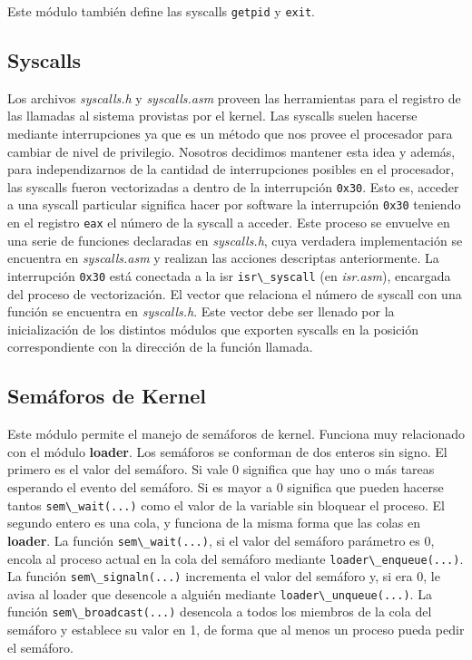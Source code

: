 \documentclass[a4paper]{article}
\newcommand{\file}[1]{\textit{#1}}
\newcommand{\func}[1]{\lstinline{#1}}
\begin{document}
Este módulo también define las syscalls \func{getpid} y \func{exit}.


\subsection{Syscalls}

Los archivos \file{syscalls.h} y \file{syscalls.asm} proveen las herramientas para el registro de las llamadas al sistema provistas por el kernel. Las syscalls suelen hacerse mediante interrupciones ya que es un método que nos provee el procesador para cambiar de nivel de privilegio. Nosotros decidimos mantener esta idea y además, para independizarnos de la cantidad de interrupciones posibles en el procesador, las syscalls fueron vectorizadas a dentro de la interrupción \func{0x30}. Esto es, acceder a una syscall particular significa hacer por software la interrupción \func{0x30} teniendo en el registro \func{eax} el número de la syscall a acceder. Este proceso se envuelve en una serie de funciones declaradas en \file{syscalls.h}, cuya verdadera implementación se encuentra en \file{syscalls.asm} y realizan las acciones descriptas anteriormente. La interrupción \func{0x30} está conectada a la isr \func{isr\_syscall} (en \file{isr.asm}), encargada del proceso de vectorización. El vector que relaciona el número de syscall con una función se encuentra en \file{syscalls.h}. Este vector debe ser llenado por la inicialización de los distintos módulos que exporten syscalls en la posición correspondiente con la dirección de la función llamada. 

\subsection{Semáforos de Kernel}

Este módulo permite el manejo de semáforos de kernel. Funciona muy relacionado con el módulo \textbf{loader}. Los semáforos se conforman de dos enteros sin signo. El primero es el valor del semáforo. Si vale 0 significa que hay uno o más tareas esperando el evento del semáforo. Si es mayor a 0 significa que pueden hacerse tantos \func{sem\_wait(...)} como el valor de la variable sin bloquear el proceso. El segundo entero es una cola, y funciona de la misma forma que las colas en \textbf{loader}. La función \func{sem\_wait(...)}, si el valor del semáforo parámetro es 0, encola al proceso actual en la cola del semáforo mediante \func{loader\_enqueue(...)}. La función \func{sem\_signaln(...)} incrementa el valor del semáforo y, si era 0, le avisa al loader que desencole a alguién mediante \func{loader\_unqueue(...)}. La función \func{sem\_broadcast(...)} desencola a todos los miembros de la cola del semáforo y establece su valor en 1, de forma que al menos un proceso pueda pedir el semáforo. 
\end{document}
